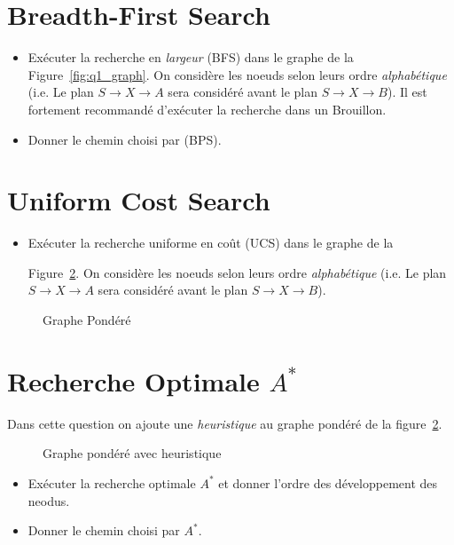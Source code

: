 \documentclass[12pt,letterpaper]{article}
\begin{document}
\section*{Breadth-First Search}%
\label{sec:}

\begin{itemize}
  \item 
Exécuter la recherche en \emph{largeur} (BFS) dans le graphe de la
Figure~\ref{fig:q1_graph}. On considère les noeuds selon leurs ordre
\emph{alphabétique} (i.e. Le plan $S\rightarrow X \rightarrow A$ sera considéré avant le plan
$S\rightarrow X\rightarrow B$). Il est fortement recommandé d'exécuter la recherche dans un
Brouillon.

\item Donner le chemin choisi par (BPS).
\end{itemize}


\section*{Uniform Cost Search}%
\label{sec:uniform_cost_search}


\begin{itemize}
  \item 
Exécuter la recherche uniforme en coût (UCS) dans le graphe de la
  
Figure~\ref{fig:q4_graph}. On considère les noeuds selon leurs ordre
\emph{alphabétique} (i.e. Le plan $S\rightarrow X \rightarrow A$ sera considéré avant le plan
$S\rightarrow X\rightarrow B$). \end{itemize}

\begin{figure}[htpb]
  \centering
  
  \caption{Graphe Pondéré}
  \label{fig:q4_graph}
\end{figure}


\section*{Recherche Optimale $A^*$}%
\label{sec:recherche_optimale_a_}

Dans cette question on ajoute une \emph{heuristique} au graphe pondéré de la figure~\ref{fig:q4_graph}.

\begin{figure}[htpb]
  \centering
  
  \caption{Graphe pondéré avec heuristique}
  \label{fig:q4_graph}
\end{figure}
\begin{itemize}
    \item Exécuter la recherche optimale $A^*$ et donner l'ordre des
      développement des neodus.
    \item Donner le chemin choisi par $A^*$.
\end{itemize}
\end{document}
